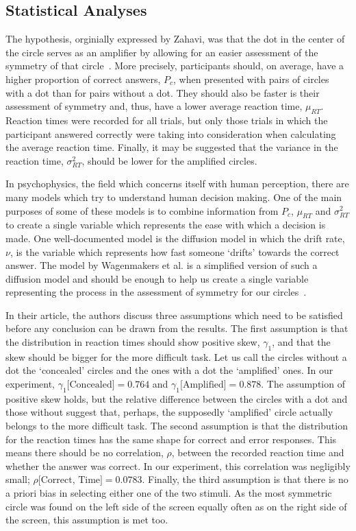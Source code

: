 \documentclass[a4paper,12pt]{article}
\numberwithin{equation}{section}
\begin{document}
\subsection{Statistical Analyses}
\label{sec:Statistical Analyses}

The hypothesis, orginially expressed by Zahavi, was that the dot in the center of the circle serves as an amplifier by allowing for an easier assessment of the symmetry of that circle~\cite{Zahavi1978}. More precisely, participants should, on average, have a higher proportion of correct answers, $P_{c}$, when presented with pairs of circles with a dot than for pairs without a dot. They should also be faster is their assessment of symmetry and, thus, have a lower average reaction time, $\mu_{RT}$. Reaction times were recorded for all trials, but only those trials in which the participant answered correctly were taking into consideration when calculating the average reaction time. Finally, it may be suggested that the variance in the reaction time, $\sigma_{RT}^{2}$, should be lower for the amplified circles.

In psychophysics, the field which concerns itself with human perception, there are many models which try to understand human decision making. One of the main purposes of some of these models is to combine information from $P_{c}$, $\mu_{RT}$ and $\sigma_{RT}^{2}$ to create a single variable which represents the ease with which a decision is made. One well-documented model is the diffusion model in which the drift rate, $\nu$, is the variable which represents how fast someone `drifts' towards the correct answer. The model by Wagenmakers et al. is a simplified version of such a diffusion model and should be enough to help us create a single variable representing the process in the assessment of symmetry for our circles~\cite{Wagenmakers2007}.

In their article, the authors discuss three assumptions which need to be satisfied before any conclusion can be drawn from the results. The first assumption is that the distribution in reaction times should show positive skew, $\gamma_{1}$, and that the skew should be bigger for the more difficult task. Let us call the circles without a dot the `concealed' circles and the ones with a dot the `amplified' ones. In our experiment, $\gamma_{1}\text{[Concealed]} = 0.764$ and $\gamma_{1}\text{[Amplified]} = 0.878$. The assumption of positive skew holds, but the relative difference between the circles with a dot and those without suggest that, perhaps, the supposedly `amplified' circle actually belongs to the more difficult task. The second assumption is that the distribution for the reaction times has the same shape for correct and error responses. This means there should be no correlation, $\rho$, between the recorded reaction time and whether the answer was correct. In our experiment, this correlation was negligibly small; $\rho \text{[Correct, Time]} = 0.0783$. Finally, the third assumption is that there is no a priori bias in selecting either one of the two stimuli. As the most symmetric circle was found on the left side of the screen equally often as on the right side of the screen, this assumption is met too.
\end{document}
